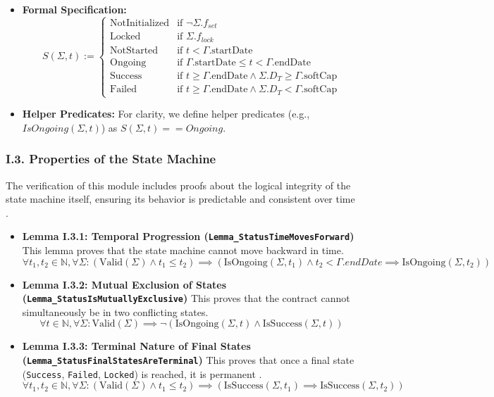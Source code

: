 \documentclass[
  english,
  onecolumn]{article}
\providecommand{\tightlist}{%
  \setlength{\itemsep}{0pt}\setlength{\parskip}{0pt}}
\begin{document}
\begin{itemize}
\tightlist
\item
  \textbf{Formal Specification:} \[
  S(\Sigma, t) := \begin{cases}
  \text{NotInitialized} & \text{if } \neg \Sigma.f_{set} \\
  \text{Locked} & \text{if } \Sigma.f_{lock} \\
  \text{NotStarted} & \text{if } t < \Gamma.\text{startDate} \\
  \text{Ongoing} & \text{if } \Gamma.\text{startDate} \le t < \Gamma.\text{endDate} \\
  \text{Success} & \text{if } t \ge \Gamma.\text{endDate} \land \Sigma.D_T \ge \Gamma.\text{softCap} \\
  \text{Failed} & \text{if } t \ge \Gamma.\text{endDate} \land \Sigma.D_T < \Gamma.\text{softCap}
  \end{cases}
  \]
\item
  \textbf{Helper Predicates:} For clarity, we define helper predicates
  (e.g., \(IsOngoing(\Sigma, t)\)) as \(S(\Sigma, t) == Ongoing\).
\end{itemize}

\subsubsection{I.3. Properties of the State
Machine}\label{i.3.-properties-of-the-state-machine}

The verification of this module includes proofs about the logical
integrity of the state machine itself, ensuring its behavior is
predictable and consistent over time
.

\begin{itemize}
\item
  \textbf{Lemma I.3.1: Temporal Progression
  (\texttt{Lemma\_StatusTimeMovesForward})} This lemma proves that the
  state machine cannot move backward in time.
  \[ \forall t_1, t_2 \in \mathbb{N}, \forall \Sigma : (\text{Valid}(\Sigma) \land t_1 \le t_2) \implies (\text{IsOngoing}(\Sigma, t_1) \land t_2 < \Gamma.endDate \implies \text{IsOngoing}(\Sigma, t_2)) \]
\item
  \textbf{Lemma I.3.2: Mutual Exclusion of States
  (\texttt{Lemma\_StatusIsMutuallyExclusive})} This proves that the
  contract cannot simultaneously be in two conflicting states.
  \[ \forall t \in \mathbb{N}, \forall \Sigma : \text{Valid}(\Sigma) \implies \neg(\text{IsOngoing}(\Sigma, t) \land \text{IsSuccess}(\Sigma, t)) \]
\item
  \textbf{Lemma I.3.3: Terminal Nature of Final States
  (\texttt{Lemma\_StatusFinalStatesAreTerminal})} This proves that once
  a final state (\texttt{Success}, \texttt{Failed}, \texttt{Locked}) is
  reached, it is permanent .
  \[ \forall t_1, t_2 \in \mathbb{N}, \forall \Sigma : (\text{Valid}(\Sigma) \land t_1 \le t_2) \implies (\text{IsSuccess}(\Sigma, t_1) \implies \text{IsSuccess}(\Sigma, t_2)) \]
\end{itemize}
\end{document}
